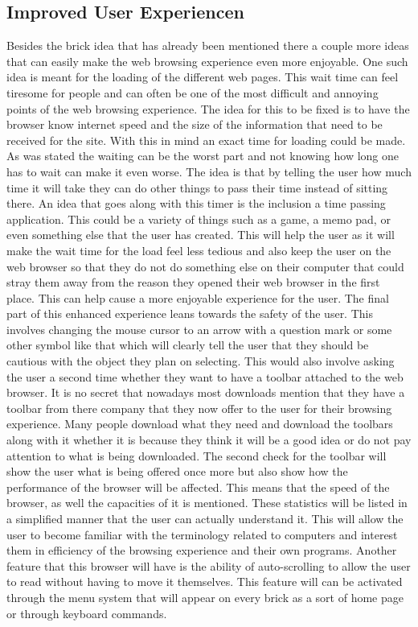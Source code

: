 \documentclass[11pt]{article}
\begin{document}
\subsection{Improved User Experiencen}
Besides the brick idea that has already been mentioned there a couple more ideas that can easily make the web browsing experience even more enjoyable. One such idea is meant for the loading of the different web pages. This wait time can feel tiresome for people and can often be one of the most difficult and annoying points of the web browsing experience. The idea for this to be fixed is to have the browser know internet speed and the size of the information that need to be received for the site. With this in mind an exact time for loading could be made. As was stated the waiting can be the worst part and not knowing how long one has to wait can make it even worse. The idea is that by telling the user how much time it will take they can do other things to pass their time instead of sitting there. An idea that goes along with this timer is the inclusion a time passing application. This could be a variety of things such as a game, a memo pad, or even something else that the user has created. This will help the user as it will make the wait time for the load feel less tedious and also keep the user on the web browser so that they do not do something else on their computer that could stray them away from the reason they opened their web browser in the first place. This can help cause a more enjoyable experience for the user. The final part of this enhanced experience leans towards the safety of the user. This involves changing the mouse cursor to an arrow with a question mark or some other symbol like that which will clearly tell the user that they should be cautious with the object they plan on selecting. This would also involve asking the user a second time whether they want to have a toolbar attached to the web browser. It is no secret that nowadays most downloads mention that they have a toolbar from there company that they now offer to the user for their browsing experience. Many people download what they need and download the toolbars along with it whether it is because they think it will be a good idea or do not pay attention to what is being downloaded. The second check for the toolbar will show the user what is being offered once more but also show how the performance of the browser will be affected. This means that the speed of the browser, as well the capacities of it is mentioned. These statistics will be listed in a simplified manner that the user can actually understand it. This will allow the user to become familiar with the terminology related to computers and interest them in efficiency of the browsing experience and their own programs. Another feature that this browser will have is the ability of auto-scrolling to allow the user to read without having to move it themselves. This feature will can be activated through the menu system that will appear on every brick as a sort of home page or through keyboard commands.
\end{document}
